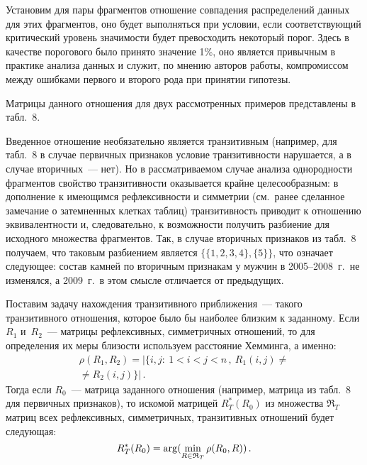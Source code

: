 \begin{multicols}{2}
      Установим для пары фрагментов отношение совпадения распределений данных для 
этих фрагментов, оно будет выполняться при условии, если соответствующий критический 
уровень значимости будет превосходить некоторый порог. Здесь в качестве порогового было 
принято значение 1\%, оно является привычным в практике анализа данных и служит, по 
мнению авторов работы, компромиссом между ошибками первого и второго рода при 
принятии гипотезы. 

Матрицы данного отношения для двух рас\-смот\-рен\-ных примеров 
представлены в табл.~8.
      

      
      Введенное отношение необязательно является транзитивным (например, для табл.~8 
в случае первич\-ных признаков условие транзитивности нарушает\-ся, а в случае 
      вторичных~--- нет). Но в рас\-смат\-ри\-ва\-емом случае анализа однородности фрагментов 
свойство транзитивности оказывается крайне целесообразным: в дополнение к имеющимся 
рефлексивности и симметрии (см.\ ранее сделанное
 замечание о затемненных клетках 
таблиц) транзитивность приводит к отношению эквивалентности и, следовательно, к 
возможности получить разбиение для исходного множества фрагментов. Так, в случае 
вторичных признаков из табл.~8 получаем, что таковым разбиением является $\{\{1, 2, 3, 4\}, 
\{5\}\}$, что означает следующее: состав камней по вторичным признакам у мужчин в 
      2005--2008~г.\ не изменялся, а 2009~г.\ в этом смысле отличается от предыдущих.
      
      Поставим задачу нахождения транзитивного приближения~--- такого транзитивного 
отношения, которое было бы наиболее близким к задан\-ному. Если $R_1$ и~$R_2$~--- 
матрицы рефлексивных, сим\-мет\-рич\-ных отношений, то для определения их меры близости 
используем расстояние Хемминга, а именно:
\begin{multline*}
\rho (R_1,R_2)= \vert \{ i,j:\ 1< 
i<j<n\,,\ R_1(i,j)\not={}\\
{}\not= R_2(i,j)\}\vert\,.
\end{multline*}
Тогда если $R_0$~--- матрица заданного 
отношения (например, матрица из табл.~8 для первичных признаков), то искомой матрицей 
$R^*_T(R_0)$  из множества $\mathfrak{R}_T$ мат\-риц всех рефлексивных, 
симметричных, транзитивных отношений будет следующая: 
$$
R_T^*(R_0)\hm= \mathrm{arg} 
(\min\limits_{R\in\mathfrak{R}_T} \rho (R_0,R))\,.
$$


\end{multicols}
